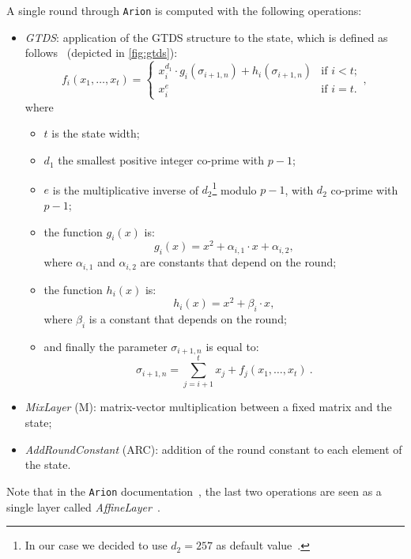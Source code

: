 \documentclass[12pt, a4paper]{report}
\begin{document}
A single round through \texttt{Arion} is computed with the following operations:
\begin{itemize}
  \item \textit{GTDS}: application of the GTDS structure to the state, which is defined as follows~\cite[Def.~1]{arion} (depicted in \autoref{fig:gtds}):
    \begin{equation}
      f_i(x_1, \ldots, x_t) = \left\{
          \begin{array}{ll}
            x_i^{d_1} \cdot g_i(\sigma_{i+1, n}) + h_i(\sigma_{i+1, n}) & \text{if } i < t; \\
            x_i^{e} & \text{if } i = t.
          \end{array}
        \right. ,
      \label{eq:gtds}
    \end{equation}
    where
    \begin{itemize}
      \item $t$ is the state width;
      \item $d_1$ the smallest positive integer co-prime with $p-1$;
      \item $e$ is the multiplicative inverse of $d_2$\footnote{In our case we decided to use $d_2 = 257$ as default value~\cite[Tab.~2]{arion}.} modulo $p-1$, with $d_2$ co-prime with $p-1$;
      \item the function $g_i(x)$ is:
        \begin{equation}
          g_i(x) = x^2 + \alpha_{i,1} \cdot x + \alpha_{i,2} ,
          \label{eq:g}
        \end{equation}
        where $\alpha_{i,1}$ and $\alpha_{i,2}$ are constants that depend on the round;
      \item the function $h_i(x)$ is:
        \begin{equation}
          h_i(x) = x^2 + \beta_i \cdot x,
          \label{eq:h}
        \end{equation}
        where $\beta_i$ is a constant that depends on the round;
      \item and finally the parameter $\sigma_{i+1, n}$ is equal to:
        \begin{equation}
          \sigma_{i+1, n} = \sum_{j=i+1}^{t} x_j + f_j(x_1, \ldots, x_t)\ .
          \label{eq:theta}
        \end{equation}
    \end{itemize}
  \item \textit{MixLayer} (M): matrix-vector multiplication between a fixed matrix and the state;
  \item \textit{AddRoundConstant} (ARC): addition of the round constant to each element of the state.
\end{itemize}
Note that in the \texttt{Arion} documentation~\cite{arion}, the last two operations are seen as a single layer called \textit{AffineLayer}~\cite[Def.~3]{arion}.
\end{document}
